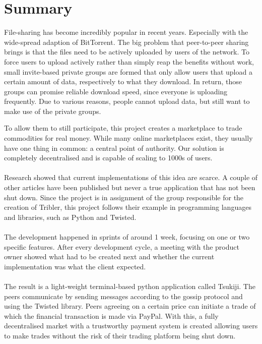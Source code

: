 \section{Summary} 
File-sharing has become incredibly popular in recent years. 
Especially with the wide-spread adaption of BitTorrent. 
The big problem that peer-to-peer sharing brings is that the files need to be actively uploaded by users of the network.
To force users to upload actively rather than simply reap the benefits without work, small invite-based private groups are formed that only allow users that upload a certain amount of data, respectively to what they download.
In return, those groups can promise reliable download speed, since everyone is uploading frequently.
Due to various reasons, people cannot upload data, but still want to make use of the private groups.

To allow them to still participate, this project creates a marketplace to trade commodities for real money.
While many online marketplaces exist, they usually have one thing in common: a central point of authority.
Our solution is completely decentralised and is capable of scaling to 1000s of users.\\
\\
Research showed that current implementations of this idea are scarce.
A couple of other articles have been published but never a true application that has not been shut down.
Since the project is in assignment of the group responsible for the creation of Tribler, this project follows their example in programming languages and libraries, such as Python and Twisted.\\
\\
The development happened in sprints of around 1 week, focusing on one or two specific features.
After every development cycle, a meeting with the product owner showed what had to be created next and whether the current implementation was what the client expected.\\
\\
The result is a light-weight terminal-based python application called Tsukiji.
The peers communicate by sending messages according to the gossip protocol and using the Twisted library.
Peers agreeing on a certain price can initiate a trade of which the financial transaction is made via PayPal.
With this, a fully decentralised market with a trustworthy payment system is created allowing users to make trades without the risk of their trading platform being shut down.